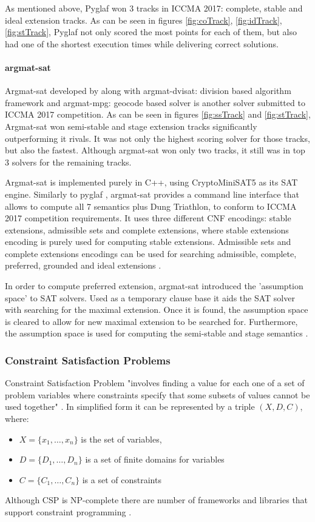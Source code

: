 As mentioned above, Pyglaf won 3 tracks in ICCMA 2017: complete, stable and ideal extension tracks. As can be seen in figures \ref{fig:coTrack}, \ref{fig:idTrack}, \ref{fig:stTrack}, Pyglaf not only scored the most points for each of them, but also had one of the shortest execution times while delivering correct solutions.

\paragraph{argmat-sat}
Argmat-sat developed by \citet{argmatSat} along with argmat-dvisat: division based algorithm framework \citep{argmatDvisat} and argmat-mpg: geocode based solver is another solver submitted to ICCMA 2017 competition. As can be seen in figures \ref{fig:ssTrack} and \ref{fig:stTrack}, Argmat-sat won semi-stable and stage extension tracks significantly outperforming it rivals. It was not only the highest scoring solver for those tracks, but also the fastest. Although argmat-sat won only two tracks, it still was in top 3 solvers for the remaining tracks.

Argmat-sat is implemented purely in C++, using CryptoMiniSAT5 \citep{CryptoMiniSat} as its SAT engine. Similarly to pyglaf \citep{pyglaf}, argmat-sat provides a command line interface that allows to compute all 7 semantics plus Dung Triathlon, to conform to ICCMA 2017 competition requirements. It uses three different CNF encodings: stable extensions, admissible sets and complete extensions, where stable extensions encoding is purely used for computing stable extensions. Admissible sets and complete extensions encodings can be used for searching admissible, complete, preferred, grounded and ideal extensions \citep{argmatSat}. 

In order to compute preferred extension, argmat-sat introduced the 'assumption space' to SAT solvers. Used as a temporary clause base it aids the SAT solver with searching for the maximal extension. Once it is found, the assumption space is cleared to allow for new maximal extension to be searched for. Furthermore, the assumption space is used for computing the semi-stable and stage semantics \citep{argmatSat}.


\subsubsection{Constraint Satisfaction Problems}
Constraint Satisfaction Problem "involves finding a value for each one of a set of problem variables where constraints specify that some subsets of values cannot be used together" \citep{csp1}. In simplified form it can be represented by a triple $(X, D, C)$, where:
\begin{itemize}
	\item $X = \{x_1, \ldots, x_n\} $ is the set of variables,
	\item $ D = \{D_1, \ldots, D_n \} $ is a set of finite domains for variables
	\item $ C = \{ C_1, \ldots, C_n \} $ is a set of constraints
\end{itemize}
Although CSP is NP-complete there are number of frameworks and libraries that support constraint programming \citep{solvingMethods}.

